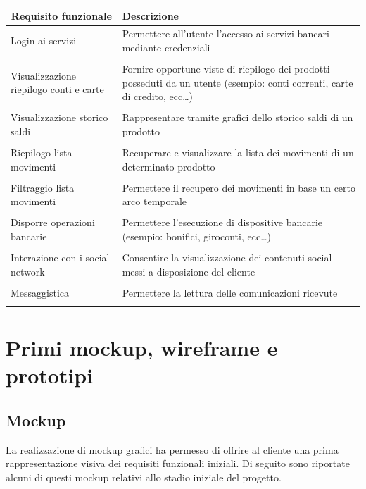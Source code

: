 \begin{center}

    \begin{tabular}{p{6cm}|p{8cm}}

    \toprule
    \multicolumn{1}{c}{\textbf{Requisito funzionale}} &
    \textbf{Descrizione}\\

    \midrule
    Login ai servizi & Permettere all'utente l'accesso ai servizi bancari mediante credenziali \\\\
    Visualizzazione riepilogo conti e carte & Fornire opportune viste di riepilogo dei prodotti posseduti da un utente (esempio: conti correnti, carte di credito, ecc\dots)\\\\
    Visualizzazione storico saldi & Rappresentare tramite grafici dello storico saldi di un prodotto\\\\
    Riepilogo lista movimenti & Recuperare e visualizzare la lista dei movimenti di un determinato prodotto\\\\
    Filtraggio lista movimenti & Permettere il recupero dei movimenti in base un certo arco temporale\\\\
    Disporre operazioni bancarie & Permettere l'esecuzione di dispositive bancarie (esempio: bonifici, giroconti, ecc\dots) \\\\
    Interazione con i social network & Consentire la visualizzazione dei contenuti social messi a disposizione del cliente\\\\
    Messaggistica & Permettere la lettura delle comunicazioni ricevute  \\\\
    \bottomrule

    \end{tabular}
        \label{tab:requisiti_iniziali}

\end{center}



\section{Primi mockup, wireframe e prototipi}
\subsection{Mockup}
La realizzazione di mockup grafici ha permesso di offrire al cliente una prima rappresentazione visiva dei requisiti funzionali iniziali. Di seguito sono riportate alcuni di questi mockup relativi allo stadio iniziale del progetto.

